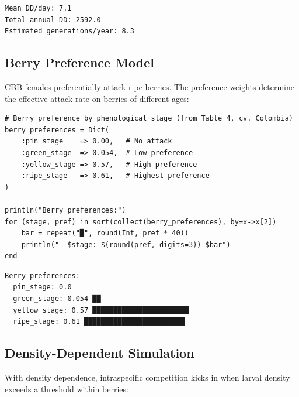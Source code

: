 \begin{verbatim}
Mean DD/day: 7.1
Total annual DD: 2592.0
Estimated generations/year: 8.3
\end{verbatim}



\subsection{Berry Preference Model}



\label{2003081574083503984}{}


CBB females preferentially attack ripe berries. The preference weights determine the effective attack rate on berries of different ages:




\begin{verbatim}
# Berry preference by phenological stage (from Table 4, cv. Colombia)
berry_preferences = Dict(
    :pin_stage    => 0.00,   # No attack
    :green_stage  => 0.054,  # Low preference
    :yellow_stage => 0.57,   # High preference
    :ripe_stage   => 0.61,   # Highest preference
)

println("Berry preferences:")
for (stage, pref) in sort(collect(berry_preferences), by=x->x[2])
    bar = repeat("█", round(Int, pref * 40))
    println("  $stage: $(round(pref, digits=3)) $bar")
end
\end{verbatim}




\begin{verbatim}
Berry preferences:
  pin_stage: 0.0 
  green_stage: 0.054 ██
  yellow_stage: 0.57 ███████████████████████
  ripe_stage: 0.61 ████████████████████████
\end{verbatim}



\subsection{Density-Dependent Simulation}



\label{13454053139340187285}{}


With density dependence, intraspecific competition kicks in when larval density exceeds a threshold within berries:




